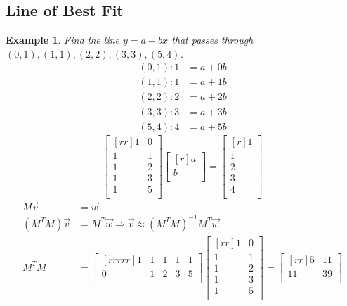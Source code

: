 \documentclass{report}
\newtheorem*{ex}{Example}
\begin{document}
\subsection{Line of Best Fit}
\begin{ex}
Find the line $y=a+bx$ that passes through $(0,1),(1,1),(2,2),(3,3),(5,4)$.\\
\begin{align*}
(0,1): 1&=a+0b\\
(1,1): 1&=a+1b\\
(2,2): 2&=a+2b\\
(3,3): 3&=a+3b\\
(5,4): 4&=a+5b
\end{align*}
\[ \begin{bmatrix}[rr]1&0\\1&1\\1&2\\1&3\\1&5\\\end{bmatrix}\begin{bmatrix}[r]a\\b\\\end{bmatrix}=\begin{bmatrix}[r]1\\1\\2\\3\\4\\\end{bmatrix} \]
\begin{align*}
M\vec{v}&=\vec{w}\\
(M^TM)\vec{v}&=M^T\vec{w}\Rightarrow \vec{v}\approx (M^TM)^{-1}M^T\vec{w}\\
M^TM&=\begin{bmatrix}[rrrrr]1&1&1&1&1\\0&1&2&3&5\\\end{bmatrix}\begin{bmatrix}[rr]1&0\\1&1\\1&2\\1&3\\1&5\\\end{bmatrix}= \begin{bmatrix}[rr]5&11\\11&39\\\end{bmatrix}\\

\end{align*}
\end{ex}
\end{document}

